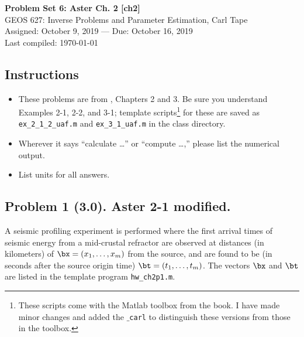 \documentclass[11pt,titlepage,fleqn]{article}
\begin{document}

\begin{spacing}{1.2}
\centering
{\large \bf Problem Set 6: Aster Ch. 2 [ch2]} \\
GEOS 627: Inverse Problems and Parameter Estimation, Carl Tape \\
Assigned: October 9, 2019 --- Due: October 16, 2019 \\
Last compiled: \today
\end{spacing}


\subsection*{Instructions}

\begin{itemize}
\item These problems are from \citet{AsterE2}, Chapters 2 and 3. Be sure you understand Examples 2-1, 2-2, and 3-1; template scripts\footnote{These scripts come with the Matlab toolbox from the book. I have made minor changes and added the {\tt $\_$carl} to distinguish these versions from those in the toolbox.}  for these are saved as \verb+ex_2_1_2_uaf.m+ and \verb+ex_3_1_uaf.m+ in the class directory.
\item Wherever it says ``calculate \ldots'' or ``compute \ldots,'' please list the numerical output.
\item List units for all answers.
\end{itemize}

\subsection*{Problem 1 (3.0). Aster 2-1 modified.}

A seismic profiling experiment is performed where the first arrival times of seismic energy from a mid-crustal refractor are observed at distances (in kilometers) of $\bx = (x_1, \ldots, x_m)$ from the source, and are found to be (in seconds after the source origin time) $\bt = (t_1, \ldots, t_m)$. The vectors $\bx$ and $\bt$ are listed in the template program \verb+hw_ch2p1.m+.
\end{document}
